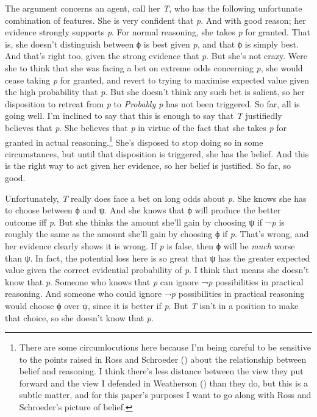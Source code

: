 \documentclass[
  11pt,
  letterpaper,
  DIV=11,
  numbers=noendperiod,
  twoside]{scrartcl}
\begin{document}
The argument concerns an agent, call her \emph{T}, who has the following
unfortunate combination of features. She is very confident that
\emph{p}. And with good reason; her evidence strongly supports \emph{p}.
For normal reasoning, she takes \emph{p} for granted. That is, she
doesn't distinguish between ϕ is best given \emph{p}, and that ϕ is
simply best. And that's right too, given the strong evidence that
\emph{p}. But she's not crazy. Were she to think that she was facing a
bet on extreme odds concerning \emph{p}, she would cease taking \emph{p}
for granted, and revert to trying to maximise expected value given the
high probability that \emph{p}. But she doesn't think any such bet is
salient, so her disposition to retreat from \emph{p} to \emph{Probably
p} has not been triggered. So far, all is going well. I'm inclined to
say that this is enough to say that \emph{T} justifiedly believes that
\emph{p}. She believes that \emph{p} in virtue of the fact that she
takes \emph{p} for granted in actual reasoning.\footnote{There are some
  circumlocutions here because I'm being careful to be sensitive to the
  points raised in Ross and Schroeder
  () about the relationship
  between belief and reasoning. I think there's less distance between
  the view they put forward and the view I defended in Weatherson
  () than they do, but this is
  a subtle matter, and for this paper's purposes I want to go along with
  Ross and Schroeder's picture of belief.} She's disposed to stop doing
so in some circumstances, but until that disposition is triggered, she
has the belief. And this is the right way to act given her evidence, so
her belief is justified. So far, so good.

Unfortunately, \emph{T} really does face a bet on long odds about
\emph{p}. She knows she has to choose between ϕ and ψ. And she knows
that ϕ will produce the better outcome iff \emph{p}. But she thinks the
amount she'll gain by choosing ψ if ¬\emph{p} is roughly the same as the
amount she'll gain by choosing ϕ if \emph{p}. That's wrong, and her
evidence clearly shows it is wrong. If \emph{p} is false, then ϕ will be
\emph{much} worse than ψ. In fact, the potential loss here is so great
that ψ has the greater expected value given the correct evidential
probability of \emph{p}. I think that means she doesn't know that
\emph{p}. Someone who knows that \emph{p} can ignore ¬\emph{p}
possibilities in practical reasoning. And someone who could ignore
¬\emph{p} possibilities in practical reasoning would choose ϕ over ψ,
since it is better if \emph{p}. But \emph{T} isn't in a position to make
that choice, so she doesn't know that \emph{p}.
\end{document}

